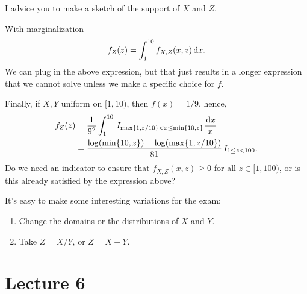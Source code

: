 \begin{exercise}
\begin{solution}
I advice you to make a sketch of the support of $X$ and $Z$.


With marginalization
\begin{equation}
  \label{eq:21}
f_{Z}(z) =
\int_{1}^{10} f_{X,Z}(x,z) \,\textrm{d}x.
\end{equation}
We can plug in the above expression, but that just results in a longer expression that we cannot solve unless we make a specific choice for $f$.

Finally, if $X,Y$ uniform on $[1,10)$, then $f(x)=1/9$, hence,
\begin{align}
  \label{eq:21}
f_{Z}(z)
&=\frac{1}{9^{2}}\int_{1}^{10}  \,I_{\max\{1, z/10\}< x \leq \min\{10, z\}} \frac{\,\textrm{d}x}{x}\\
&=\frac{\log(\min\{10, z\}) - \log(\max\{1, z/10\})}{81} \,I_{1\leq z < 100}.
\end{align}
Do we need an indicator to ensure that $f_{X,Z}(x,z)\geq0$ for all $z \in [1, 100)$, or is this already satisfied by the expression above?

It's easy to make some interesting variations for the exam:
\begin{enumerate}
\item Change the domains or the distributions of $X$ and $Y$.
\item Take $Z=X/Y$, or $Z=X+Y$.
\end{enumerate}

\end{solution}
\end{exercise}

\section{Lecture 6}


